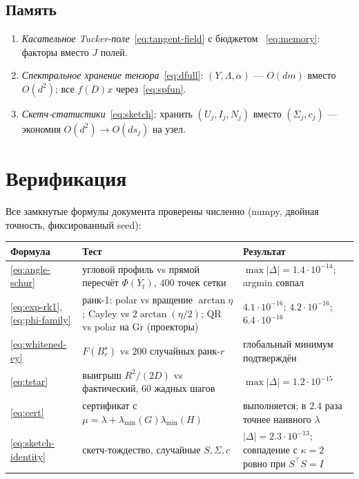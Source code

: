 \documentclass[11pt,a4paper]{article}
\newcommand{\Id}{I}
\newcommand{\T}{^{\!\top}}
\newcommand{\Gr}{\mathrm{Gr}}
\theoremstyle{plain}
\theoremstyle{definition}
\theoremstyle{remark}
\begin{document}
\subsection{Память}

\begin{enumerate}[label=\textbf{M\arabic*.},leftmargin=2.6em]
\item \emph{Касательное Tucker-поле}~\eqref{eq:tangent-field} с бюджетом
~\eqref{eq:memory}: факторы вместо $J$ полей.
\item \emph{Спектральное хранение тензора}~\eqref{eq:dfull}: $(Y,\Lambda,\alpha)$
--- $O(dm)$ вместо $O(d^2)$; все $f(D)x$ через~\eqref{eq:spfun}.
\item \emph{Скетч-статистики}~\eqref{eq:sketch}: хранить $(U_j,I_j,N_j)$
вместо $(\Sigma_j,c_j)$ --- экономия $O(d^2)\to O(ds_j)$ на узел.
\end{enumerate}

\section{Верификация}\label{sec:verification}

Все замкнутые формулы документа проверены численно (numpy, двойная точность,
фиксированный seed):

\begin{center}
\small
\begin{tabularx}{\textwidth}{@{}lXl@{}}
\toprule
\textbf{Формула} & \textbf{Тест} & \textbf{Результат}\\
\midrule
\eqref{eq:angle-schur} & угловой профиль vs прямой пересчёт $\Phi(Y_t)$,
$400$ точек сетки & $\max|\Delta|=1.4\cdot10^{-14}$; argmin совпал\\
\eqref{eq:exp-rk1}, \eqref{eq:phi-family} & ранк-1: polar vs вращение
$\arctan\eta$; Cayley vs $2\arctan(\eta/2)$; QR vs polar на $\Gr$
(проекторы) & $4.1\cdot10^{-16}$; $4.2\cdot10^{-16}$;
$6.4\cdot10^{-16}$\\
\eqref{eq:whitened-ey} & $F(B_r^\star)$ vs $200$ случайных ранк-$r$
& глобальный минимум подтверждён\\
\eqref{eq:tstar} & выигрыш $R^2/(2D)$ vs фактический, $60$ жадных шагов
& $\max|\Delta|=1.2\cdot10^{-15}$\\
\eqref{eq:cert} & сертификат с $\mu=\lambda+\lambda_{\min}(G)\lambda_{\min}(H)$
& выполняется; в $2.4$ раза точнее наивного $\lambda$\\
\eqref{eq:sketch-identity} & скетч-тождество, случайные $S,\Sigma,c$
& $|\Delta|=2.3\cdot10^{-13}$; совпадение с $\kappa=2$ ровно при
$S\T S=\Id$\\
\bottomrule
\end{tabularx}
\end{center}
\end{document}
